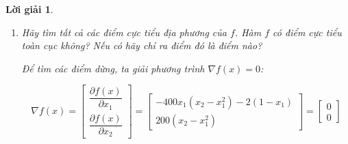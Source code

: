 \documentclass[14pt, a4paper]{article}
\theoremstyle{sltheorem}
\theoremstyle{soltheorem}
\newtheorem*{loigiai}{Lời giải}
\begin{document}
\begin{loigiai}
\begin{enumerate} [wide, labelwidth=!, labelindent=0pt,label=\textbf{\arabic*}.]
            Dấu của định thức này phụ thuộc vào $x_1, x_2$.
            \begin{itemize}
                \item Nếu $x_2 > \dfrac{1200x_1^2 + 2}{400}$ thì định thức $\det (\begin{bmatrix} -400 x_2 + 1200x_1^2 + 2 \end{bmatrix})<0$
                \item Nếu $x_2 < \dfrac{1200x_1^2 + 2}{400}$ thì $\det (\begin{bmatrix} -400 x_2 + 1200x_1^2 + 2 \end{bmatrix})>0$
            \end{itemize}
            Do định thức con chính đầu tiên lớn hơn 0 hay nhỏ hơn 0 phụ thuộc vào $x_1, x_2$ nên ta không cần xét thêm các định thức con chính tiếp theo. 
            Ma trận Hessian $\nabla^2 f(x)$ là ma trận không xác định dấu.

            $\nabla^2 f(x)$ là ma trận không xác định dấu nên $f(x)$ không là hàm lồi

            \item Hãy tìm tất cả các điểm cực tiểu địa phương của $f$. Hàm $f$ có điểm cực tiểu toàn cục không? Nếu có hãy chỉ ra điểm đó là điểm nào?
            
            Để tìm các điểm dừng, ta giải phương trình $\nabla f(x)=0$:

            \begin{equation*}
                \nabla f(x) = \begin{bmatrix} \dfrac{\partial f(x)}{\partial x_1} \\ \dfrac{\partial f(x)}{\partial x_2}\end{bmatrix} = \begin{bmatrix} -400x_1(x_2 - x_1^2) -2(1-x_1) \\ 200(x_2 - x_1^2) \end{bmatrix} = \begin{bmatrix} 0 \\ 0 \end{bmatrix}
            \end{equation*}


\end{enumerate}
\end{loigiai}
\end{document}
